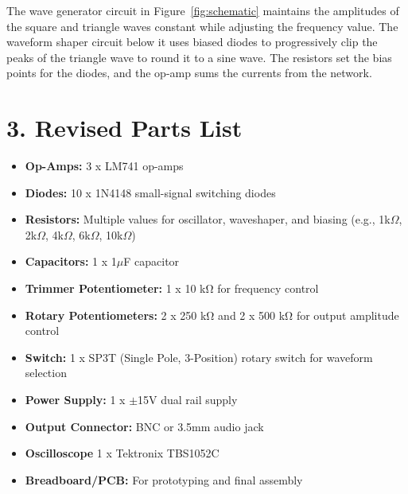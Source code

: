 \documentclass[11pt]{article}
\begin{document}
\indent The wave generator circuit in Figure~\ref{fig:schematic} maintains
the amplitudes of the square and triangle waves constant while adjusting
the frequency value. The waveform shaper circuit below it uses biased
diodes to progressively clip the peaks of the triangle wave to round it to a
sine wave. The resistors set the bias points for the diodes, and the op-amp
sums the currents from the network.



\section*{3. Revised Parts List}
\begin{itemize}
    \item \textbf{Op-Amps:} 3 x LM741 op-amps
    \item \textbf{Diodes:} 10 x 1N4148 small-signal switching diodes
    \item \textbf{Resistors:} Multiple values for oscillator, waveshaper, and biasing (e.g., 1k$\Omega$, 2k$\Omega$, 4k$\Omega$, 6k$\Omega$, 10k$\Omega$)
    \item \textbf{Capacitors:} 1 x 1$\mu$F capacitor
    \item \textbf{Trimmer Potentiometer:} 1 x 10 \si{\kilo\ohm} for frequency control
    \item \textbf{Rotary Potentiometers:} 2 x 250 \si{\kilo\ohm} and 2 x 500 \si{\kilo\ohm} for output amplitude control
    \item \textbf{Switch:} 1 x SP3T (Single Pole, 3-Position) rotary switch for waveform selection
    \item \textbf{Power Supply:} 1 x $\pm$15V dual rail supply
    \item \textbf{Output Connector:} BNC or 3.5mm audio jack
    \item \textbf{Oscilloscope} 1 x Tektronix TBS1052C
    \item \textbf{Breadboard/PCB:} For prototyping and final assembly
\end{itemize}
\end{document}
